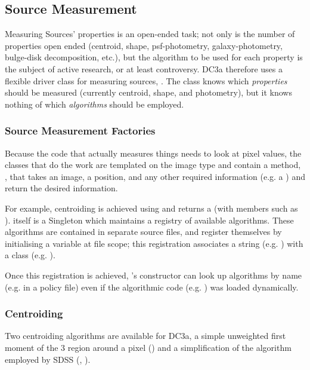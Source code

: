 \subsection{Source Measurement}
\label{secSourceMeasurement}

Measuring Sources' properties is an open-ended task;  not only is the
number of properties open ended (centroid, shape, psf-photometry, galaxy-photometry,
bulge-disk decomposition, etc.), but the algorithm to be
used for each property is the subject of active research, or at least
controversy.  DC3a therefore uses a flexible driver class for measuring
sources, .  The class knows which \textit{properties}
should be measured (currently centroid, shape, and photometry), but
it knows nothing of which \textit{algorithms} should be employed.  

\subsubsection{Source Measurement Factories}
\label{secSourceMeasurementFactories}

Because the code that actually measures things needs to look at pixel
values, the classes that do the work are templated on the image type
and contain a method, , that takes an image, a position,
and any other required information (e.g. a ) and return the
desired information.

For example, centroiding is achieved using  and\break {}
returns a  (with members such as ).   itself is a Singleton which
maintains a registry of available algorithms.  These algorithms are contained in separate source files, and register
themselves by initialising a variable at file scope; this registration associates a string (e.g. ) with a
class (e.g. ).

Once this registration is achieved, 's constructor can look up algorithms by name (e.g. in a policy
file) even if the algorithmic code (e.g. ) was loaded dynamically.

\subsubsection{Centroiding}

Two centroiding algorithms are available for DC3a, a simple unweighted first moment
of the 3 region around a pixel () and a simplification of the algorithm employed by
SDSS (, \citet{SDSSAstrom}).

